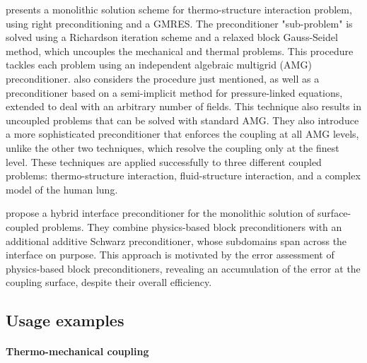 \cite{danowski_monolithic_2013} presents a monolithic solution scheme for thermo-structure interaction problem, using right preconditioning and a GMRES.
The preconditioner "sub-problem" is solved using a Richardson iteration scheme and a relaxed block Gauss-Seidel method, which uncouples the mechanical and thermal problems.
This procedure tackles each problem using an independent algebraic multigrid (AMG) preconditioner.
\cite{verdugo_unified_2016} also considers the procedure just mentioned, as well as a preconditioner based on a semi-implicit method for pressure-linked equations, extended to deal with an arbitrary number of fields.
This technique also results in uncoupled problems that can be solved with standard AMG.
They also introduce a more sophisticated preconditioner that enforces the coupling at all AMG levels, unlike the other two techniques, which resolve the coupling only at the finest level.
These techniques are applied successfully to three different coupled problems: thermo-structure interaction, fluid-structure interaction, and a complex model of the human lung.

\cite{mayr_hybrid_2020} propose a hybrid interface preconditioner for the monolithic solution of surface-coupled problems.
They combine physics-based block preconditioners with an additional additive Schwarz preconditioner, whose subdomains span across the interface on purpose.
This approach is motivated by the error assessment of physics-based block preconditioners, revealing an accumulation of the error at the coupling surface, despite their overall efficiency.

\newpage


\subsection{Usage examples}

\paragraph{Thermo-mechanical coupling}

